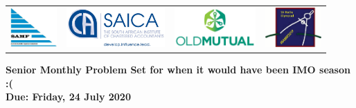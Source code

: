 \documentclass{article}
\begin{document}
\setlength{\tabcolsep}{5pt}
\begin{center} \begin{tabular}{cccc}
	\includegraphics[height=43pt]{SAMF_logo.jpg} &
	\includegraphics[height=43pt]{SAICA_logo.jpg} &
	\includegraphics[height=43pt]{OM_Logo_Stacked_Vignette_on_White_RGB.jpg} &
	\includegraphics[height=43pt]{SAMO2019.png}
\end{tabular} \end{center}

\bigskip

\begin{center}
\textbf{\Large Senior Monthly Problem Set for when it would have been IMO season :(}
\\ \vspace{1em}
\textbf{\large Due: Friday, 24 July 2020}
\end{center}
\end{document}
